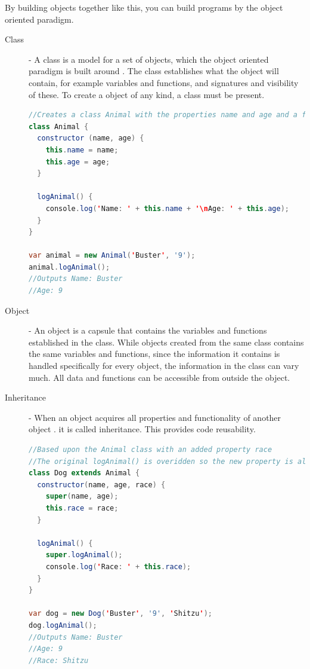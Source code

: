 \documentclass {article}
\begin{document}
By building objects together like this, you can build programs by the object oriented paradigm.  

\begin{description}
\item [Class] - A class is a model for a set of objects, which the object oriented paradigm is built around \cite{gabmar}. The class establishes what the object will contain, for example variables and functions, and signatures and visibility of these. To create a object of any kind, a class must be present. 

\begin{lstlisting}[language=Java]
//Creates a class Animal with the properties name and age and a function for logging the properties to the screen
class Animal {
  constructor (name, age) {
    this.name = name;
    this.age = age;
  }

  logAnimal() {
    console.log('Name: ' + this.name + '\nAge: ' + this.age);
  }
}

var animal = new Animal('Buster', '9');
animal.logAnimal();
//Outputs Name: Buster
//Age: 9
\end{lstlisting}

\item [Object] - An object is a capsule that contains the variables and functions established in the class. While objects created from the same class contains the same variables and functions, since the information it contains is handled specifically for every object, the information in the class can vary much. All data and functions can be accessible from outside the object. 

\item [Inheritance] - When an object acquires all properties and functionality of another object \cite{skansholm}. it is called inheritance. This provides code reusability. 

\begin{lstlisting}[language=Java, breaklines=true]
//Based upon the Animal class with an added property race
//The original logAnimal() is overidden so the new property is also logged to the screen.
class Dog extends Animal {
  constructor(name, age, race) {
    super(name, age);
    this.race = race;
  }

  logAnimal() {
    super.logAnimal();
    console.log('Race: ' + this.race);
  }
}

var dog = new Dog('Buster', '9', 'Shitzu');
dog.logAnimal();
//Outputs Name: Buster
//Age: 9
//Race: Shitzu
\end{lstlisting}


\end{description}
\end{document}
